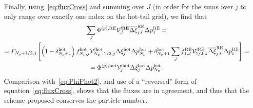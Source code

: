 \documentclass{notes}
\newcommand{\Vp}{\mathcal{V}'}
\begin{document}
    Finally, using~\eqref{eq:fluxCross} and summing over $J$ (in order for the
    sums over $j$ to only range over exactly one index on the hot-tail grid), we
    find that
    \begin{equation}
        \begin{gathered}
            \sum_J \Phi^{(p),{\rm RE}} \Vp^{\rm RE}_J \overline{\Delta\xi}_{jJ}^{\rm RE}\Delta p_1^{\rm RE} =\\
             = F_{N_p+1/2,j}\left[
                 \left( 1-\delta^{\rm hot}_{N_p+1} \right)
                 f^{\rm hot}_{N_p,j}
                 \Vp^{\rm hot}_{N_p+1/2,j}\Delta\xi_j^{\rm hot}\Delta p_{N_p}^{\rm hot}
                 +
                 \delta^{\rm hot}_{N_p+1}\sum_J f_{1,J}^{\rm RE}\Vp^{\rm RE}_{1/2,J}
                 \overline{\Delta\xi}^{\rm RE}_{jJ}\Delta p_1^{\rm RE}
             \right] =\\
             = \Phi^{(p),{\rm hot}} \Vp^{\rm hot}_j\Delta\xi^{\rm hot}_j\Delta p_{N_p}^{\rm hot}.
        \end{gathered}
    \end{equation}
    Comparison with~\eqref{eq:PhiPhot2}, and use of a ``reversed'' form of
    equation~\eqref{eq:fluxCross}, shows that the fluxes are in agreement, and
    thus that the scheme proposed conserves the particle number.
\end{document}
